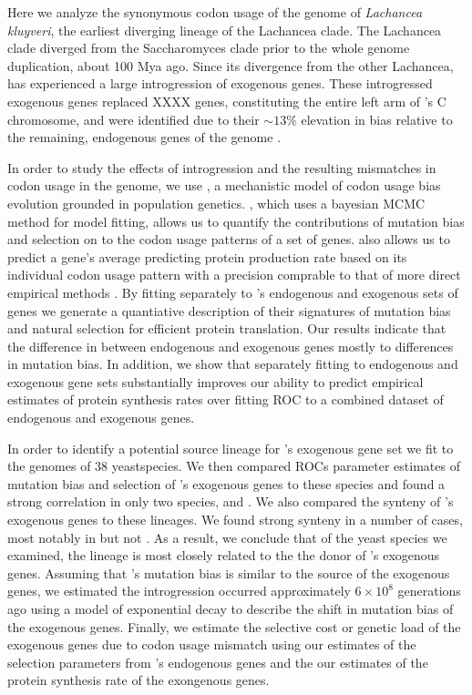 \documentclass[12pt]{article}
\begin{document}
Here we analyze the synonymous codon usage of the genome of \emph{Lachancea kluyveri}, the earliest diverging lineage of the Lachancea clade.
The Lachancea clade diverged from the Saccharomyces clade prior to the whole genome duplication, about 100 Mya ago.
Since its divergence from the other Lachancea, \kluyveri  has experienced a large introgression of exogenous genes.
These introgressed exogenous genes replaced XXXX genes, constituting the entire left arm of \Klu's C chromosome, and were identified due to their $\sim13\%$ elevation in \GC bias relative to the remaining, endogenous genes of the \Klu genome \citep{payen2009, friedrich2015}.

In order to study the effects of introgression and the resulting mismatches in codon usage in the \Klu genome,  we use \ROC, a mechanistic model of codon usage bias evolution grounded in population genetics.
\ROC, which uses a bayesian MCMC method for model fitting,  allows us to quantify the contributions of mutation bias and selection on to the codon usage patterns of a set of genes.
\ROC also allows us to predict a gene's average predicting protein production rate based on its individual codon usage pattern with a precision comprable to that of more direct empirical methods \citep{gilchrist2015}.
By fitting \ROC separately to \Klu's endogenous and exogenous sets of genes we generate a quantiative description of their signatures of mutation bias and natural selection for efficient protein translation.
Our results indicate that the difference in \GC between endogenous and exogenous genes mostly to differences in mutation bias.
In addition, we show that separately fitting \ROC to endogenous and exogenous gene sets substantially improves our ability to predict empirical estimates of protein synthesis rates over fitting ROC to a combined dataset of endogenous and exogenous genes.

In order to identify a potential source lineage for \Klu's exogenous gene set we fit \ROC to the genomes of 38 yeastspecies.
We then compared ROCs parameter estimates of mutation bias and selection of \Klu's exogenous genes to these species and found a strong correlation in only two species, \gossypii and \dubl.
We also compared the synteny of \Klu's exogenous genes to these lineages.
We found strong synteny in a number of cases, most notably in \gossypii but not \dubl.
As a result, we conclude that of the yeast species we examined, the \gossypii lineage is most closely related to the the donor of \Klu's exogenous genes.
Assuming that \gossypii's mutation bias is similar to the source of the exogenous genes, we estimated the introgression occurred approximately $6 \times 10^8$ generations ago using a model of exponential decay to describe the  shift in mutation bias of the exogenous genes.
Finally, we estimate the selective cost or genetic load of the exogenous genes due to codon usage mismatch using our estimates of the selection parameters from \Klu's endogenous genes and the our estimates of the protein synthesis rate of the exongenous genes.
\end{document}
